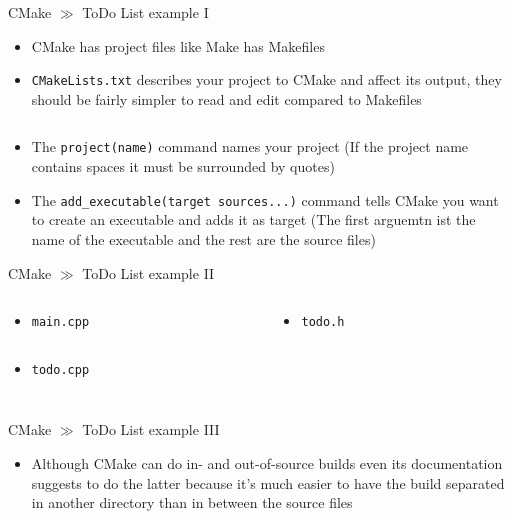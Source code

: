 \documentclass[10pt]{beamer}
\begin{document}
\begin{frame}{CMake $\gg$ ToDo List example I}
\begin{itemize}
	\item CMake has project files like Make has Makefiles
	\item \texttt{CMakeLists.txt} describes your project to CMake and affect its output, they should be fairly simpler to read and edit compared to Makefiles
	\inputminted[bgcolor=lightGreyCustom,fontsize=\scriptsize]{cmake}{./resources/CMake_ToDo_List/CMakeLists.txt}
	\item The \texttt{project(name)} command names your project (If the project name contains spaces it must be surrounded by quotes)
	\item The \texttt{add_executable(target sources...)} command tells CMake you want to create an executable and adds it as target (The first arguemtn ist the name of the executable and the rest are the source files)
\end{itemize}
\end{frame}

\begin{frame}{CMake $\gg$ ToDo List example II}
\begin{columns}
	\begin{column}{0.675\textwidth}
		\begin{itemize}
			\item \texttt{main.cpp}
			\inputminted[bgcolor=lightGreyCustom,fontsize=\scriptsize]{cpp}{./resources/CMake_ToDo_List/main.cpp}
			\item \texttt{todo.cpp}
			\inputminted[bgcolor=lightGreyCustom,fontsize=\scriptsize]{cpp}{./resources/CMake_ToDo_List/todo.cpp}
		\end{itemize}
	\end{column}
	\begin{column}{0.325\textwidth}
		\begin{itemize}
			\item \texttt{todo.h}
			\inputminted[bgcolor=lightGreyCustom,fontsize=\scriptsize]{cpp}{./resources/CMake_ToDo_List/todo.h}
		\end{itemize}
	\end{column}
\end{columns}
\end{frame}

\begin{frame}{CMake $\gg$ ToDo List example III}
\begin{itemize}
	\item Although CMake can do in- and out-of-source builds even  its documentation suggests to do the latter because it's much easier to have the build separated in another directory than in between the source files
	\inputminted[bgcolor=lightGreyCustom,fontsize=\scriptsize]{sh}{./resources/CMake_ToDo_List/createCmakeMakefile.sh}
\end{itemize}
\end{frame}
\end{document}
